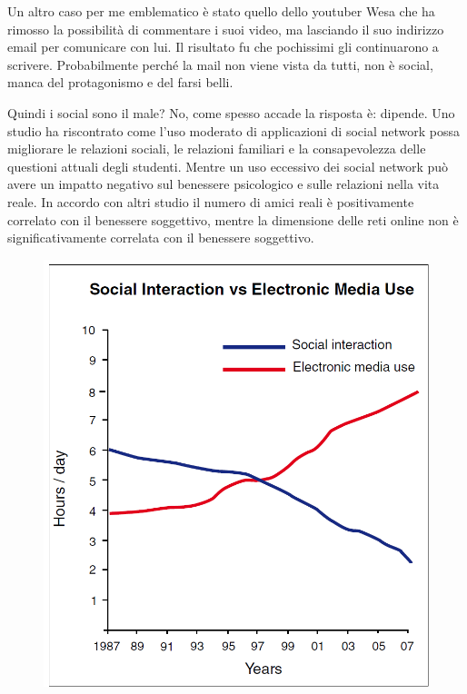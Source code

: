 \documentclass[12pt]{book} %
\begin{document}
\begin{mdframed}[linewidth=1pt]
Un altro caso per me emblematico è stato quello dello youtuber Wesa che ha rimosso la possibilità di commentare i suoi
video, ma lasciando il suo indirizzo email per comunicare con lui. Il risultato fu che pochissimi gli continuarono a
scrivere. Probabilmente perché la mail non viene vista da tutti, non è social, manca del protagonismo e del farsi
belli.

Quindi i social sono il male? No, come spesso accade la risposta è: dipende. Uno studio ha riscontrato come l'uso moderato di applicazioni di social network possa migliorare le relazioni sociali, le relazioni familiari e la consapevolezza delle questioni attuali degli studenti. Mentre un uso eccessivo dei social network può avere un impatto negativo sul benessere psicologico e sulle relazioni nella vita reale. In accordo con altri studio il numero di amici reali è positivamente correlato con il benessere soggettivo, mentre la dimensione delle reti online non è significativamente correlata con il benessere soggettivo.

\begin{figure}
  \includegraphics[width=0.95\linewidth]{images/Libro-img056.png}
\end{figure}


\end{mdframed}
\end{document}
